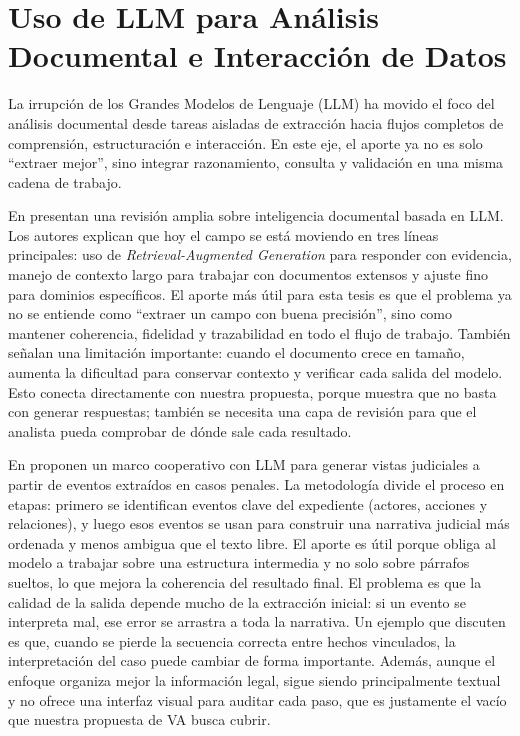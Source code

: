 \section{Uso de \texorpdfstring{\acs{LLM}}{LLMs} para Análisis Documental e Interacción de Datos}

La irrupción de los Grandes Modelos de Lenguaje (\acs{LLM}) ha movido el foco del análisis documental desde tareas aisladas de extracción hacia flujos completos de comprensión, estructuración e interacción. En este eje, el aporte ya no es solo ``extraer mejor'', sino integrar razonamiento, consulta y validación en una misma cadena de trabajo.

En \cite{ke2025document} presentan una revisión amplia sobre inteligencia documental basada en \acs{LLM}. Los autores explican que hoy el campo se está moviendo en tres líneas principales: uso de \textit{Retrieval-Augmented Generation} para responder con evidencia, manejo de contexto largo para trabajar con documentos extensos y ajuste fino para dominios específicos. El aporte más útil para esta tesis es que el problema ya no se entiende como ``extraer un campo con buena precisión'', sino como mantener coherencia, fidelidad y trazabilidad en todo el flujo de trabajo. También señalan una limitación importante: cuando el documento crece en tamaño, aumenta la dificultad para conservar contexto y verificar cada salida del modelo. Esto conecta directamente con nuestra propuesta, porque muestra que no basta con generar respuestas; también se necesita una capa de revisión para que el analista pueda comprobar de dónde sale cada resultado.

En \cite{yue2023event} proponen un marco cooperativo con \acs{LLM} para generar vistas judiciales a partir de eventos extraídos en casos penales. La metodología divide el proceso en etapas: primero se identifican eventos clave del expediente (actores, acciones y relaciones), y luego esos eventos se usan para construir una narrativa judicial más ordenada y menos ambigua que el texto libre. El aporte es útil porque obliga al modelo a trabajar sobre una estructura intermedia y no solo sobre párrafos sueltos, lo que mejora la coherencia del resultado final. El problema es que la calidad de la salida depende mucho de la extracción inicial: si un evento se interpreta mal, ese error se arrastra a toda la narrativa. Un ejemplo que discuten es que, cuando se pierde la secuencia correcta entre hechos vinculados, la interpretación del caso puede cambiar de forma importante. Además, aunque el enfoque organiza mejor la información legal, sigue siendo principalmente textual y no ofrece una interfaz visual para auditar cada paso, que es justamente el vacío que nuestra propuesta de \acs{VA} busca cubrir.

